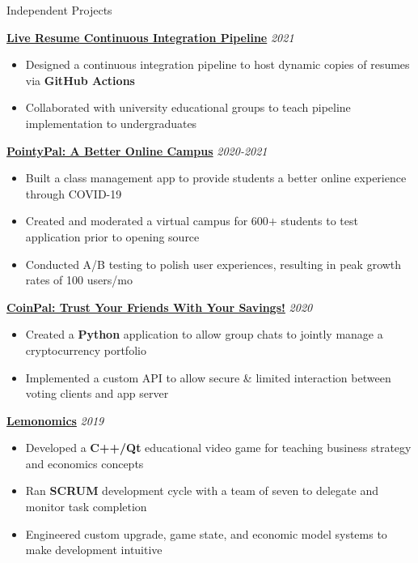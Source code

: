 \documentclass{resume/resume}
\begin{document}
\begin{rSection}{Independent Projects}
    
    \href{https://spelkington.github.io/Job-Search-Hell/}{\bf Live Resume Continuous Integration Pipeline} \hfill {\em 2021}
    \vspace{-6pt}
    \begin{itemize}[nosep]
        \item Designed a continuous integration pipeline to host dynamic copies of resumes via {\bf GitHub Actions}
        \item Collaborated with university educational groups to teach pipeline implementation to undergraduates
    \end{itemize}

    \href{https://github.com/UtahTriangle/pointypal}{\bf PointyPal: A Better Online Campus} \hfill {\em 2020-2021}
    \vspace{-6pt}
    \begin{itemize}[nosep]
        \item Built a class management app to provide students a better online experience through COVID-19
        \item Created and moderated a virtual campus for 600$+$ students to test application prior to opening source 
        \item Conducted A/B testing to polish user experiences, resulting in peak growth rates of 100 users/mo
    \end{itemize}

    \href{https://spelkington.github.io}{\bf CoinPal: Trust Your Friends With Your Savings!} \hfill {\em 2020}
    \vspace{-6pt}
    \begin{itemize}[nosep]
        \item Created a {\bf Python} application to allow group chats to jointly manage a cryptocurrency portfolio
        \item Implemented a custom API to allow secure \& limited interaction between voting clients and app server 
    \end{itemize}

    \href{https://github.com/University-of-Utah-CS3505/a8-an-educational-app-f18-ChaoticEvan}{\bf Lemonomics} \hfill {\em 2019}
    \vspace{-6pt}
    \begin{itemize}[nosep]
        \item Developed a {\bf C++/Qt} educational video game for teaching business strategy and economics concepts
        \item Ran {\bf SCRUM} development cycle with a team of seven to delegate and monitor task completion
        \item Engineered custom upgrade, game state, and economic model systems to make development intuitive
    \end{itemize}
    

\end{rSection}
\end{document}
